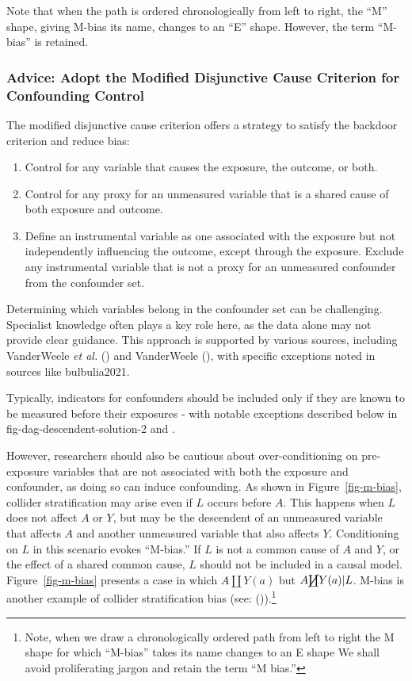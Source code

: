 \documentclass[
  singlecolumn,
  9pt]{article}
\providecommand{\tightlist}{%
  \setlength{\itemsep}{0pt}\setlength{\parskip}{0pt}}\usepackage{longtable,booktabs,array}
\begin{document}
Note that when the path is ordered chronologically from left to right,
the ``M'' shape, giving M-bias its name, changes to an ``E'' shape.
However, the term ``M-bias'' is retained.

\subsubsection{Advice: Adopt the Modified Disjunctive Cause Criterion
for Confounding
Control}\label{advice-adopt-the-modified-disjunctive-cause-criterion-for-confounding-control}

The modified disjunctive cause criterion offers a strategy to satisfy
the backdoor criterion and reduce bias:

\begin{enumerate}
\def\labelenumi{\alph{enumi}.}
\tightlist
\item
  Control for any variable that causes the exposure, the outcome, or
  both.
\item
  Control for any proxy for an unmeasured variable that is a shared
  cause of both exposure and outcome.
\item
  Define an instrumental variable as one associated with the exposure
  but not independently influencing the outcome, except through the
  exposure. Exclude any instrumental variable that is not a proxy for an
  unmeasured confounder from the confounder set.
\end{enumerate}

Determining which variables belong in the confounder set can be
challenging. Specialist knowledge often plays a key role here, as the
data alone may not provide clear guidance. This approach is supported by
various sources, including VanderWeele \emph{et al.}
() and VanderWeele
(), with specific exceptions noted
in sources like bulbulia2021.

Typically, indicators for confounders should be included only if they
are known to be measured before their exposures - with notable
exceptions described below in fig-dag-descendent-solution-2 and .

However, researchers should also be cautious about over-conditioning on
pre-exposure variables that are not associated with both the exposure
and confounder, as doing so can induce confounding. As shown in
Figure~\ref{fig-m-bias}, collider stratification may arise even if \(L\)
occurs before \(A\). This happens when \(L\) does not affect \(A\) or
\(Y\), but may be the descendent of an unmeasured variable that affects
\(A\) and another unmeasured variable that also affects \(Y\).
Conditioning on \(L\) in this scenario evokes ``M-bias.'' If \(L\) is
not a common cause of \(A\) and \(Y\), or the effect of a shared common
cause, \(L\) should not be included in a causal model.
Figure~\ref{fig-m-bias} presents a case in which \(A \coprod Y(a)\) but
\(A \cancel{\coprod} Y(a)| L\). M-bias is another example of collider
stratification bias (see: ()).\footnote{Note, when we draw a chronologically ordered path from
  left to right the M shape for which ``M-bias'' takes its name changes
  to an E shape We shall avoid proliferating jargon and retain the term
  ``M bias.''}
\end{document}
